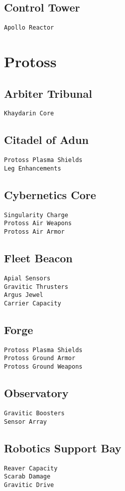 \subsection{Control Tower}
\verb|Apollo Reactor|

\section{Protoss}

\subsection{Arbiter Tribunal}
\verb|Khaydarin Core|

\subsection{Citadel of Adun}
\verb|Protoss Plasma Shields|\\
\verb|Leg Enhancements|

\subsection{Cybernetics Core}
\verb|Singularity Charge|\\
\verb|Protoss Air Weapons|\\
\verb|Protoss Air Armor|

\subsection{Fleet Beacon}
\verb|Apial Sensors|\\
\verb|Gravitic Thrusters| \\
\verb|Argus Jewel|\\
\verb|Carrier Capacity|

\subsection{Forge}
\verb|Protoss Plasma Shields|\\
\verb|Protoss Ground Armor|\\
\verb|Protoss Ground Weapons|

\subsection{Observatory}
\verb|Gravitic Boosters|\\
\verb|Sensor Array|

\subsection{Robotics Support Bay}
\verb|Reaver Capacity|\\
\verb|Scarab Damage|\\
\verb|Gravitic Drive|

